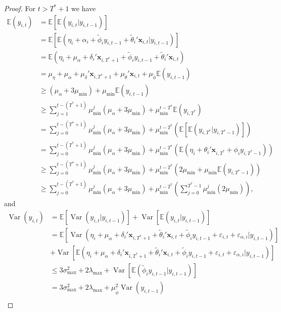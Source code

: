 \documentclass[11pt]{article}
\newcommand{\x}{\textbf{x}}
\def\E{\mathbb{E}} %
\DeclareMathOperator{\Var}{Var} %
\theoremstyle{definition}
\begin{document}
\begin{proof}
For $t > T^* + 1$ we have 
\begin{align*}
  \E(y_{i,t}) &= \E\left[\E(y_{i,t}|y_{i,t-1})\right] \\ 
    &= \E\left[\E(\eta_i + \alpha_i + \tilde\phi_i y_{i,t-1} 
      + \tilde\theta_i'\x_{i,t}|y_{i,t-1})\right] \\
    &= \E(\eta_i + \mu_\alpha + \delta_i'\x_{i,T^*+1} + \tilde\phi_i y_{i,t-1} + \tilde\theta_i'\x_{i,t}) \\
    &= \mu_\eta + \mu_\alpha + \mu_\delta'\x_{i,T^*+1} + \mu_{\tilde\theta}'\x_{i,t} + \mu_{\tilde\phi}\E(y_{i,t-1}) \\
    &\geq (\mu_\alpha + 3\mu_{\min}) + \mu_{\min}\E(y_{i,t-1}) \\
    &\geq \sum_{j=1}^{t - (T^* + 1)} \mu_{\min}^j(\mu_{\alpha} + 3\mu_{\min}) + \mu_{\min}^{t-T^*}\E(y_{i,T^*}) \\
    &= \sum_{j=0}^{t - (T^* + 1)} \mu_{\min}^j(\mu_{\alpha} + 3\mu_{\min}) + \mu_{\min}^{t-T^*}\left(\E\left[\E(y_{i,T^*}|y_{i,T^*-1})\right]\right) \\   
    &= \sum_{j=0}^{t - (T^* + 1)} \mu_{\min}^j(\mu_{\alpha} + 3\mu_{\min}) + \mu_{\min}^{t-T^*}\left(\E(\eta_i + \theta_i'\x_{i,T^*} + \phi_i y_{i,T^*-1}) \right) \\
    &\geq \sum_{j=0}^{t - (T^* + 1)} \mu_{\min}^j(\mu_{\alpha} + 3\mu_{\min}) + \mu_{\min}^{t-T^*}\left(2\mu_{\min} + \mu_{\min} \E(y_{i,T^*-1}) \right) \\
    &\geq \sum_{j=0}^{t - (T^* + 1)} \mu_{\min}^j(\mu_{\alpha} + 3\mu_{\min}) + \mu_{\min}^{t-T^*}\left(\sum_{j=0}^{T^*-1}\mu_{\min}^j(2\mu_{\min}) \right), 
\end{align*}
and 
\begin{align*}
  \Var(y_{i,t})	&= \E\left[\Var(y_{i,t}|y_{i,t-1})\right] + \Var\left[\E(y_{i,t}|y_{i,t-1})\right] \\
  &= \E\left[\Var(\eta_i + \mu_\alpha + \delta_i'\x_{i,T^*+1} + \tilde\theta_i'\x_{i,t} + \tilde\phi_i y_{i,t-1} + \varepsilon_{i,t} + \varepsilon_{\alpha,i}|y_{i,t-1})\right] \\
  &+ \Var\left[\E(\eta_i + \mu_\alpha + \delta_i'\x_{i,T^*+1} + \tilde\theta_i'\x_{i,t} + \tilde\phi_i y_{i,t-1} + \varepsilon_{i,t} + \varepsilon_{\alpha,i}|y_{i,t-1})\right] \\
  &\leq 3\sigma^2_{\max} + 2\lambda_{\max} + \Var\left[\E(\tilde\phi_i y_{i,t-1}|y_{i,t-1})\right] \\
  &= 3\sigma^2_{\max} + 2\lambda_{\max} + \mu_{\tilde\phi}^2\Var(y_{i,t-1}) \\

\end{align*}
\end{proof}
\end{document}
